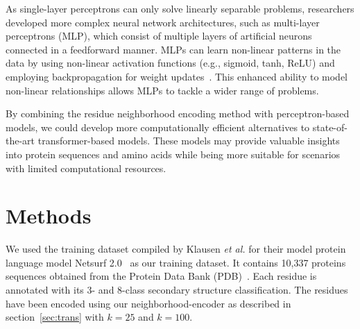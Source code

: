 As single-layer perceptrons can only solve linearly separable problems, researchers developed more complex neural network architectures, such as multi-layer perceptrons (MLP), which consist of multiple layers of artificial neurons connected in a feedforward manner. MLPs can learn non-linear patterns in the data by using non-linear activation functions (e.g., sigmoid, tanh, ReLU) and employing backpropagation for weight updates~\cite{mlp}. This enhanced ability to model non-linear relationships allows MLPs to tackle a wider range of problems.

By combining the residue neighborhood encoding method with perceptron-based models, we could develop more computationally efficient alternatives to state-of-the-art transformer-based models. These models may provide valuable insights into protein sequences and amino acids while being more suitable for scenarios with limited computational resources.

\section{Methods}
We used the training dataset compiled by Klausen \textit{et al.} for their model protein language model Netsurf 2.0~\cite{netsurf} as our training dataset. It contains 10,337 proteins sequences obtained from the Protein Data Bank (PDB)~\cite{pdb}. Each residue is annotated with its 3- and 8-class secondary structure classification. The residues have been encoded using our neighborhood-encoder as described in section~\ref{sec:trans} with $k=25$ and $k=100$.

